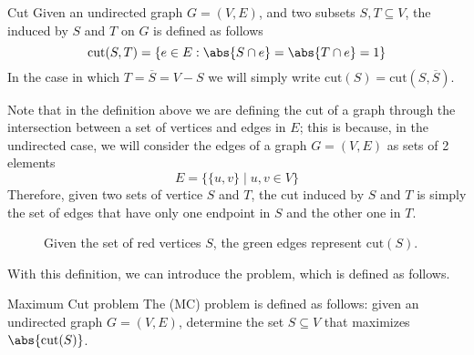 \documentclass[a4paper, 12pt]{report}
\begin{document}
    \begin{frameddefn}{Cut}
        Given an undirected graph $G = (V, E)$, and two subsets $S, T \subseteq V$, the  induced by $S$ and $T$ on $G$ is defined as follows $$\mathrm{cut}(S, T) = \{e \in E : \abs{S \cap e} = \abs{T \cap e} = 1\}$$ In the case in which $T = \overline S = V - S$ we will simply write $\mathrm{cut}(S) = \mathrm{cut}(S, \overline S)$.
    \end{frameddefn}

    Note that in the definition above we are defining the cut of a graph through the intersection between a set of vertices and edges in $E$; this is because, in the undirected case, we will consider the edges of a graph $G = (V, E)$ as sets of 2 elements $$E = \{\{u, v\} \mid u, v \in V\}$$ Therefore, given two sets of vertice $S$ and $T$, the cut induced by $S$ and $T$ is simply the set of edges that have only one endpoint in $S$ and the other one in $T$.

    \begin{figure}[H]
        \centering
        \caption{Given the set of red vertices $S$, the green edges represent $\mathrm{cut}(S)$.}
    \end{figure}

    With this definition, we can introduce the  problem, which is defined as follows.

    \begin{frameddefn}{Maximum Cut problem}
        The  (MC) problem is defined as follows: given an undirected graph $G = (V, E)$, determine the set $S \subseteq V$ that maximizes $\abs{\mathrm{cut}(S)}$.
    \end{frameddefn}
\end{document}

